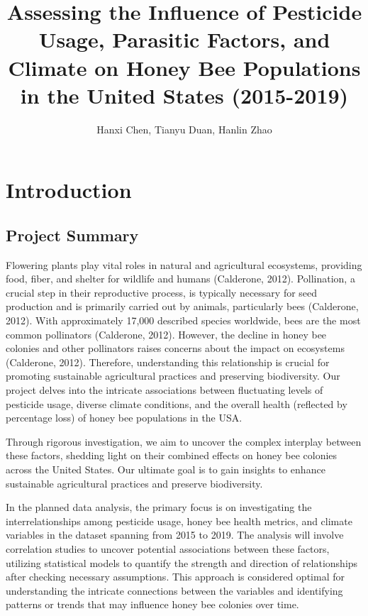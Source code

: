 \documentclass[
  letterpaper,
  DIV=11,
  numbers=noendperiod]{scrartcl}
\title{Assessing the Influence of Pesticide Usage, Parasitic Factors,
and Climate on Honey Bee Populations in the United States (2015-2019)}
\author{Hanxi Chen, Tianyu Duan, Hanlin Zhao}
\date{}
\renewcommand*\contentsname{Table of contents}
\newcommand\contentsname{Table of contents}
\begin{document}
\maketitle

\renewcommand*\contentsname{Table of contents}
{
\hypersetup{linkcolor=}
\setcounter{tocdepth}{2}
\tableofcontents
}
\section{Introduction}\label{introduction}

\subsection{Project Summary}\label{project-summary}

Flowering plants play vital roles in natural and agricultural
ecosystems, providing food, fiber, and shelter for wildlife and humans
(Calderone, 2012). Pollination, a crucial step in their reproductive
process, is typically necessary for seed production and is primarily
carried out by animals, particularly bees (Calderone, 2012). With
approximately 17,000 described species worldwide, bees are the most
common pollinators (Calderone, 2012). However, the decline in honey bee
colonies and other pollinators raises concerns about the impact on
ecosystems (Calderone, 2012). Therefore, understanding this relationship
is crucial for promoting sustainable agricultural practices and
preserving biodiversity. Our project delves into the intricate
associations between fluctuating levels of pesticide usage, diverse
climate conditions, and the overall health (reflected by percentage
loss) of honey bee populations in the USA.

Through rigorous investigation, we aim to uncover the complex interplay
between these factors, shedding light on their combined effects on honey
bee colonies across the United States. Our ultimate goal is to gain
insights to enhance sustainable agricultural practices and preserve
biodiversity.

In the planned data analysis, the primary focus is on investigating the
interrelationships among pesticide usage, honey bee health metrics, and
climate variables in the dataset spanning from 2015 to 2019. The
analysis will involve correlation studies to uncover potential
associations between these factors, utilizing statistical models to
quantify the strength and direction of relationships after checking
necessary assumptions. This approach is considered optimal for
understanding the intricate connections between the variables and
identifying patterns or trends that may influence honey bee colonies
over time.
\end{document}
